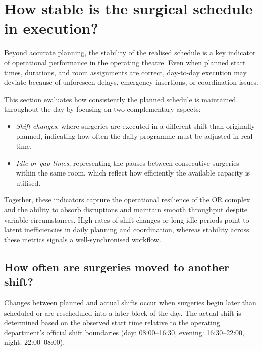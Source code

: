 \documentclass[
]{article}
\providecommand{\tightlist}{%
  \setlength{\itemsep}{0pt}\setlength{\parskip}{0pt}}
\begin{document}
\newpage

\section{How stable is the surgical schedule in
execution?}\label{how-stable-is-the-surgical-schedule-in-execution}

Beyond accurate planning, the stability of the realised schedule is a
key indicator of operational performance in the operating theatre. Even
when planned start times, durations, and room assignments are correct,
day-to-day execution may deviate because of unforeseen delays, emergency
insertions, or coordination issues.

This section evaluates how consistently the planned schedule is
maintained throughout the day by focusing on two complementary aspects:

\begin{itemize}
\tightlist
\item
  \emph{Shift changes}, where surgeries are executed in a different
  shift than originally planned, indicating how often the daily
  programme must be adjusted in real time.
\item
  \emph{Idle or gap times}, representing the pauses between consecutive
  surgeries within the same room, which reflect how efficiently the
  available capacity is utilised.
\end{itemize}

Together, these indicators capture the operational resilience of the OR
complex and the ability to absorb disruptions and maintain smooth
throughput despite variable circumstances. High rates of shift changes
or long idle periods point to latent inefficiencies in daily planning
and coordination, whereas stability across these metrics signals a
well-synchronised workflow.

\subsection{How often are surgeries moved to another
shift?}\label{how-often-are-surgeries-moved-to-another-shift}

Changes between planned and actual shifts occur when surgeries begin
later than scheduled or are rescheduled into a later block of the day.
The actual shift is determined based on the observed start time relative
to the operating department's official shift boundaries (day:
08:00--16:30, evening: 16:30--22:00, night: 22:00--08:00).
\end{document}
